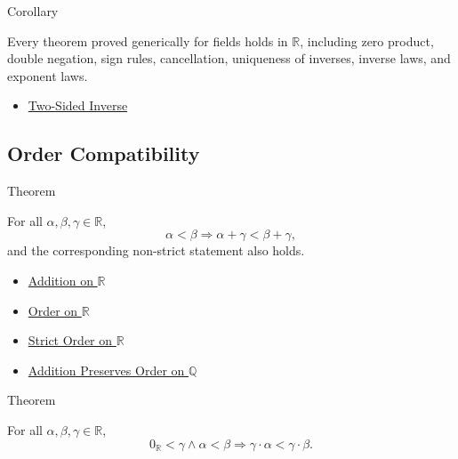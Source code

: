 \begin{corollarybox}{Corollary}
\begin{corollary}
\label{cor:field-laws-on-r}
Every theorem proved generically for fields holds in $\mathbb{R}$, including
zero product, double negation, sign rules, cancellation, uniqueness of
inverses, inverse laws, and exponent laws.
\end{corollary}
\end{corollarybox}

\begin{dependencies}
\begin{itemize}
  \item \hyperref[def:two-sided-inverse]{Two-Sided Inverse}
\end{itemize}
\end{dependencies}

\subsection*{Order Compatibility}

\begin{theorembox}{Theorem}
\begin{theorem}
\label{thm:addition-preserves-order-on-r}
For all $\alpha,\beta,\gamma\in\mathbb{R}$,
\[
\alpha<\beta \Longrightarrow \alpha+\gamma<\beta+\gamma,
\]
and the corresponding non-strict statement also holds.
\end{theorem}
\end{theorembox}

\begin{dependencies}
\begin{itemize}
  \item \hyperref[def:addition-on-r]{Addition on $\mathbb{R}$}
  \item \hyperref[def:order-on-r]{Order on $\mathbb{R}$}
  \item \hyperref[def:strict-order-on-r]{Strict Order on $\mathbb{R}$}
  \item \hyperref[thm:addition-preserves-order-on-q]{Addition Preserves Order on $\mathbb{Q}$}
\end{itemize}
\end{dependencies}

\begin{theorembox}{Theorem}
\begin{theorem}
\label{thm:positive-multiplication-preserves-order-on-r}
For all $\alpha,\beta,\gamma\in\mathbb{R}$,
\[
0_{\mathbb{R}}<\gamma\land\alpha<\beta
\Longrightarrow
\gamma\cdot\alpha<\gamma\cdot\beta.
\]
\end{theorem}
\end{theorembox}

